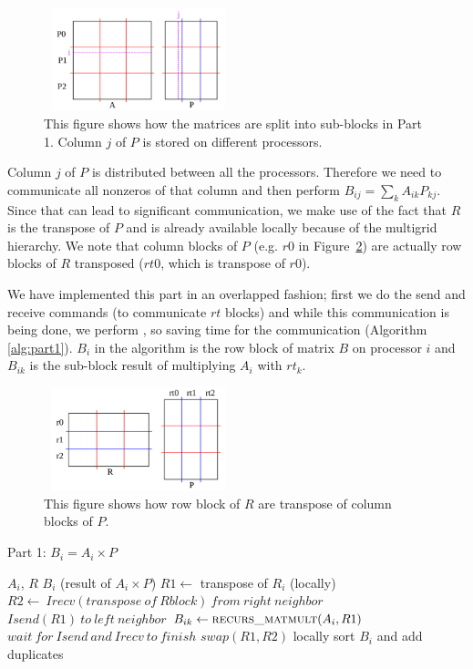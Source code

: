 \begin{figure}[tbh]
 \centering
 \includegraphics[width=5.5cm,height=3cm]{./figures/part1b.pdf}
 \caption{This figure shows how the matrices are split into sub-blocks in Part 1. Column $j$ of $P$ is stored on different processors.}
 \label{fig:part1b}
\end{figure}

Column $j$ of $P$ is distributed between all the processors. Therefore we need to communicate all nonzeros of that column and then perform $B_{ij} = \sum_{k} A_{ik} P_{kj}$. Since that can lead to significant communication, we make use of the fact that $R$ is the transpose of $P$ and is already available locally because of the multigrid hierarchy. We note that column blocks of $P$ (e.g. $r0$ in Figure~\ref{fig:part1c}) are actually row blocks of $R$ transposed ($rt0$, which is transpose of $r0$).

We have implemented this part in an overlapped fashion; first we do the send and receive commands (to communicate $rt$ blocks) and while this communication is being done, we perform \mm, so saving time for the communication (Algorithm \ref{alg:part1}). $B_{i}$ in the algorithm is the row block of matrix $B$ on processor $i$ and $B_{ik}$ is the sub-block result of multiplying $A_i$ with $rt_k$.

\begin{figure}[tbh]
 \centering
 \includegraphics[width=5.5cm,height=3cm]{./figures/part1c.pdf}
 \caption{This figure shows how row block of $R$ are transpose of column blocks of $P$.}
 \label{fig:part1c}
\end{figure}

\begin{algorithm}[H] 
  \caption{Part 1: $B_i = A_i \times P$} \label{alg:part1} 
  \begin{algorithmic}[1]
    \Require $A_i$, $R$
    \Ensure  $B_i$ (result of $A_i \times P$)
    \State $R1 \leftarrow$ transpose of $R_i$ (locally)
      \State $R2 \leftarrow\ Irecv(transpose\ of\ R block)\ from\ right\ neighbor$
      \State $Isend(R1)\ to\ left\ neighbor$
      \State $B_{ik} \leftarrow \textsc{recurs\_matmult}(A_i, R1)$ 
      \State $wait\ for\ Isend\ and\ Irecv\ to\ finish$
      \State $swap(R1,R2)$
    \EndFor
    \State locally sort $B_i$ and add duplicates
  \end{algorithmic}
\end{algorithm}


